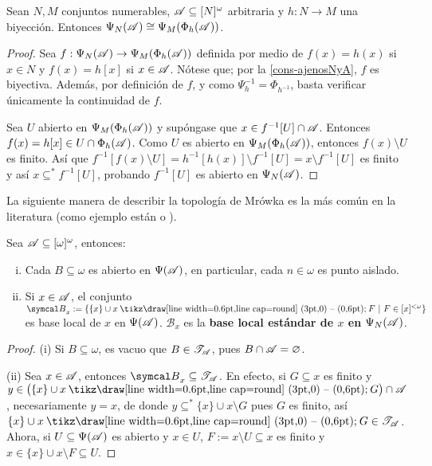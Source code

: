 \begin{proposicion}\label{prop-MrowHomeoBiyec}
	Sean $N,M$ conjuntos numerables, $\mathscr{A} \subseteq [N]^\omega$ arbitraria y $h:N \to M$ una biyección. Entonces $\Psi_N(\mathscr{A}) \cong \Psi_M(\Phi_h(\mathscr{A}))$.
\end{proposicion}
\begin{proof}
	Sea $f:\Psi_N(\mathscr{A}) \to \Psi_M(\Phi_h(\mathscr{A}))$ definida por medio de $f(x)=h(x)$ si $x \in N$ y $f(x)=h[x]$ si $x \in \mathscr{A}$. Nótese que; por la \autoref{cons-ajenosNyA}, $f$ es biyectiva. Además, por definición de $f$, y como $\Psi_h^{-1}=\Phi_{h^{-1}}$, basta verificar únicamente la continuidad de $f$.

	Sea $U$ abierto en $\Psi_M(\Phi_h(\mathscr{A}))$ y supóngase que $x \in f^{-1}[U] \cap \mathscr{A}$. Entonces $f(x) = h[x] \in U \cap \Phi_h(\mathscr{A})$. Como $U$ es abierto en $\Psi_M(\Phi_h(\mathscr{A}))$, entonces $f(x) \setminus U$ es finito. Así que $f^{-1}[f(x) \setminus U] = h^{-1}[h(x)] \setminus f^{-1}[U] = x \setminus f^{-1}[U]$ es finito y así $x \subseteq^* f^{-1}[U]$, probando $f^{-1}[U]$ es abierto en $\Psi_N(\mathscr{A})$.
\end{proof}

La siguiente manera de describir la topología de Mrówka es la más común en la literatura (como ejemplo están \cite{hruMrowka} o \cite{hruAlmost}).

\begin{proposicion}\label{prop-BaseLocMrowka}
	Sea $\mathscr{A} \subseteq [\omega]^\omega$, entonces:
	\begin{enumerate}[i)]
		\item Cada $B \subseteq \omega$ es abierto en $\Psi(\mathscr{A})$, en particular, cada $n \in \omega$ es punto aislado.
		\item Si $x \in \mathscr{A}$, el conjunto $\mathcal{B}_x:=\{ \{x\} \cup x \setminus F \tq F \in[x]^{<\omega} \}$ es base local de $x$ en $\Psi(\mathscr{A})$. $\mathcal{B}_x$ es la \textbf{base local estándar de $x$ en $\Psi_N(\mathscr{A})$}.
	\end{enumerate}
\end{proposicion}
\begin{proof}
	(i) Si $B \subseteq \omega$, es vacuo que $B \in \mathscr{T}_{\mathscr{A}}$, pues $B \cap \mathscr{A} = \varnothing$.

	(ii) Sea $x \in \mathscr{A}$, entonces $\mathcal{B}_x \subseteq \tau_\ms{A}$. En efecto, si $G \subseteq x$ es finito y $y \in \big( \{x\} \cup x \setminus G \big) \cap \ms{A}$, necesariamente $y=x$, de donde $y \subseteq^* \{x\} \cup x \setminus G$ pues $G$ es finito, así $\{x\} \cup x \setminus G \in \tau_{\ms{A}}$. Ahora, si $U \subseteq \Psi(\mathscr{A)}$ es abierto y $x \in U$, $F:= x \setminus U \subseteq x$ es finito y $x \in \{x\} \cup x \setminus F \subseteq U$.
\end{proof}

